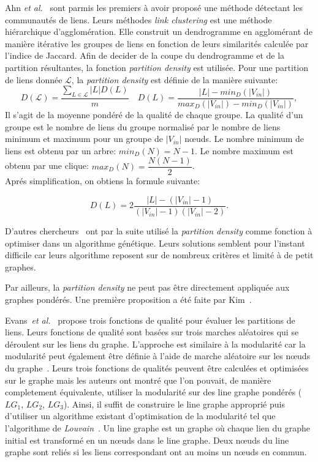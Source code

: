 Ahn \emph{et al.}~\cite{Ahn2010a} sont parmis les premiers à avoir proposé une méthode détectant les communautés de liens.
Leurs méthodes \emph{link clustering} est une méthode hiérarchique d'agglomération.
Elle construit un dendrogramme en agglomérant de manière itérative les groupes de liens en fonction de leurs similarités calculée par l'indice de Jaccard.
Afin de decider de la coupe du dendrogramme et de la partition résultantes, la fonction \emph{partition density} est utilisée.
Pour une partition de liens donnée $\mathcal{L}$, la \emph{partition density} est définie de la manière suivante:
\begin{equation}
D(\mathcal{L}) = \dfrac{\sum_{L \in \mathcal{L}} |L|D(L)}{m} \quad D(L) = \dfrac{|L|- min_D(|V_{in}|) }{max_D(|V_{in}|) - min_D(|V_{in}|)},
\end{equation}
Il s'agit de la moyenne pondéré de la qualité de chaque groupe.
La qualité d'un groupe est le nombre de liens du groupe normalisé par le nombre de liens minimum et maximum pour un groupe de $|V_{in}|$ n\oe uds.
Le nombre minimum de liens est obtenu par un arbre: $min_D(N) = N - 1$.
Le nombre maximum est obtenu par une clique: $max_D(N) = \dfrac{N(N - 1)}{2}$.\\
Aprés simplification, on obtiens la formule suivante:

\begin{equation}
 D(L) = 2 \dfrac{|L| - (|V_{in}|-1) }{(|V_{in}|-1) (|V_{in}|-2)}.
\end{equation}

D'autres chercheurs~\cite{Li2013,Shi2013} ont par la suite utilisé la \emph{partition density} comme fonction à optimiser dans un algorithme génétique.
Leurs solutions semblent pour l'instant difficile car leurs algorithme reposent sur de nombreux critères et limité à de petit graphes.

Par ailleurs, la \emph{partition density} ne peut pas être directement appliquée aux graphes pondérés.
Une première proposition a été faite par Kim~\cite{Kim2014}.


Evans~\emph{et al.}~\cite{Evans2009} propose trois fonctions de qualité pour évaluer les partitions de liens.
Leurs fonctions de qualité sont basées sur trois marches aléatoires qui se déroulent sur les liens du graphe.
L'approche est similaire à la modularité car la modularité peut également être définie à l'aide de marche aléatoire sur les n\oe uds du graphe~\cite{Delvenne2010}.
Leurs trois fonctions de qualités peuvent être calculées et optimisées sur le graphe mais les auteurs ont montré que l'on pouvait, de manière completement équivalente, utiliser la modularité sur des line graphe pondérés ($LG_1$, $LG_2$, $LG_3$).
Ainsi, il suffit de construire le line graphe approprié puis d'utiliser un algorithme existant d'optimisation de la modularité tel que l'algorithme de \emph{Louvain}~\cite{Blondel2008a}.
Un line graphe est un graphe où chaque lien du graphe initial est transformé en un n\oe uds dans le line graphe.
Deux n\oe uds du line graphe sont reliés si les liens correspondant ont au moins un n\oe uds en commun.

